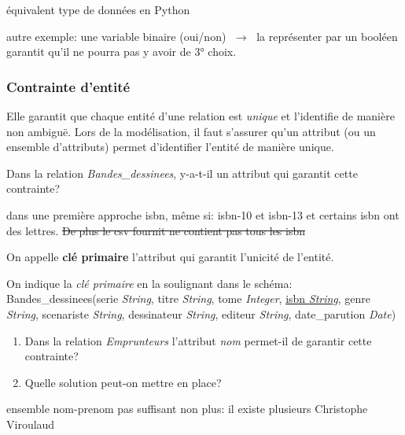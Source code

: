 \documentclass[a4paper,11pt]{article}
\begin{document}
\begin{Form}
\begin{commentprof}
équivalent type de données en Python

autre exemple: une variable binaire (oui/non) $\;\rightarrow\;$ la représenter par un booléen garantit qu'il ne pourra pas y avoir de 3° choix.
\end{commentprof}
\subsubsection{Contrainte d'entité}
Elle garantit que chaque entité d'une relation est \emph{unique} et l'identifie de manière non ambiguë. Lors de la modélisation, il faut s'assurer qu'un attribut (ou un ensemble d'attributs) permet d'identifier l'entité de manière unique.
\begin{activite}
Dans la relation \emph{Bandes\_dessinees}, y-a-t-il un attribut qui garantit cette contrainte?
\begin{commentprof}
dans une première approche isbn, même si: isbn-10 et isbn-13 et certains isbn ont des lettres. \sout{De plus le csv fournit ne contient pas tous les isbn}
\end{commentprof}
\end{activite}
\begin{aretenir}[]
On appelle \textbf{clé primaire} l'attribut qui garantit l'unicité de l'entité.
\end{aretenir}
On indique la \emph{clé primaire} en la soulignant dans le schéma:\\
Bandes\_dessinees(serie \emph{String}, titre \emph{String}, tome \emph{Integer}, \underline{isbn \emph{String}}, genre \emph{String}, scenariste \emph{String}, dessinateur \emph{String}, editeur \emph{String}, date\_parution \emph{Date})
\begin{activite}
\begin{enumerate}
\item Dans la relation \emph{Emprunteurs} l'attribut \emph{nom} permet-il de garantir cette contrainte?
\item Quelle solution peut-on mettre en place?
\end{enumerate}
\begin{commentprof}
ensemble nom-prenom pas suffisant non plus: il existe plusieurs  Christophe Viroulaud
\end{commentprof}
\end{activite}

\end{Form}
\end{document}
